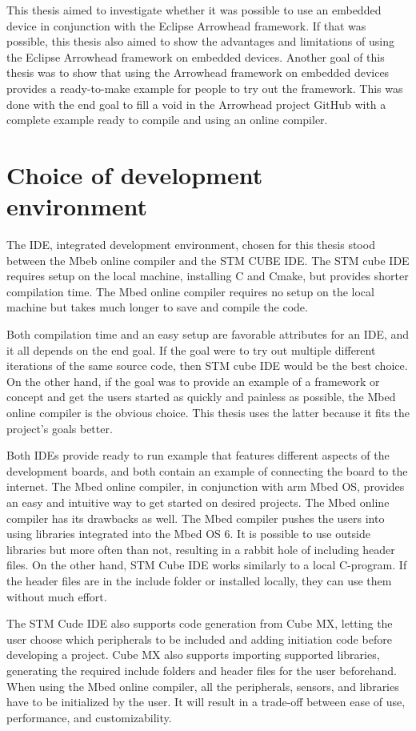 This thesis aimed to investigate whether it was possible to use an embedded device in conjunction with the Eclipse Arrowhead framework.
If that was possible, this thesis also aimed to show the advantages and limitations of using the Eclipse Arrowhead framework on embedded devices.
Another goal of this thesis was to show that using the Arrowhead framework on embedded devices provides a ready-to-make example for people to try out the framework.
This was done with the end goal to fill a void in the Arrowhead project GitHub with a complete example ready to compile and using an online compiler.

\section{Choice of development environment}
The IDE, integrated development environment, chosen for this thesis stood between the Mbeb online compiler and the STM CUBE IDE. 
The STM cube IDE requires setup on the local machine, installing C and Cmake, but provides shorter compilation time.
The Mbed online compiler requires no setup on the local machine but takes much longer to save and compile the code.

Both compilation time and an easy setup are favorable attributes for an IDE, and it all depends on the end goal.
If the goal were to try out multiple different iterations of the same source code, then STM cube IDE would be the best choice.
On the other hand, if the goal was to provide an example of a framework or concept and get the users started as quickly and painless as possible, the Mbed online compiler is the obvious choice.
This thesis uses the latter because it fits the project's goals better.  


Both IDEs provide ready to run example that features different aspects of the development boards, and both contain an example of connecting the board to the internet.
The Mbed online compiler, in conjunction with arm Mbed OS, provides an easy and intuitive way to get started on desired projects.
The Mbed online compiler has its drawbacks as well. 
The Mbed compiler pushes the users into using libraries integrated into the Mbed OS 6.
It is possible to use outside libraries but more often than not, resulting in a rabbit hole of including header files.
On the other hand, STM Cube IDE works similarly to a local C-program. 
If the header files are in the include folder or installed locally, they can use them without much effort.

The STM Cude IDE also supports code generation from Cube MX, letting the user choose which peripherals to be included and adding initiation code before developing a project.
Cube MX also supports importing supported libraries, generating the required include folders and header files for the user beforehand. 
When using the Mbed online compiler, all the peripherals, sensors, and libraries have to be initialized by the user.
It will result in a trade-off between ease of use, performance, and customizability.

